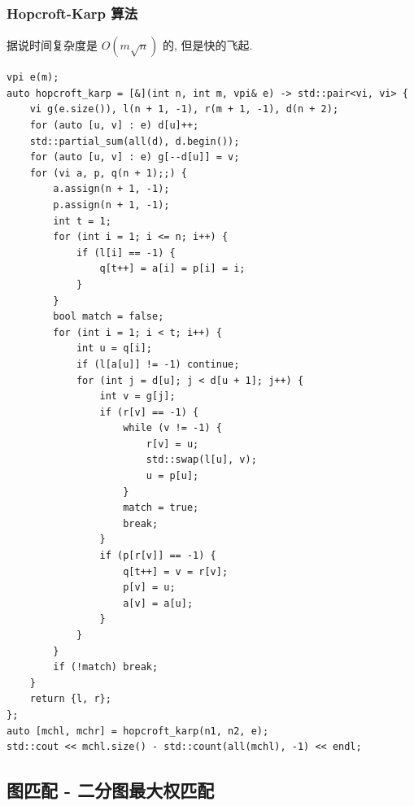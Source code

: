 \documentclass[UTF8, a4paper, titlepage, twoside]{ctexart}
\begin{document}
\subsubsection{ Hopcroft-Karp 算法 }
据说时间复杂度是 $O(m \sqrt{n})$ 的, 但是快的飞起. 
\begin{lstlisting}[style=cpp]
vpi e(m);
auto hopcroft_karp = [&](int n, int m, vpi& e) -> std::pair<vi, vi> {
    vi g(e.size()), l(n + 1, -1), r(m + 1, -1), d(n + 2);
    for (auto [u, v] : e) d[u]++;
    std::partial_sum(all(d), d.begin());
    for (auto [u, v] : e) g[--d[u]] = v;
    for (vi a, p, q(n + 1);;) {
        a.assign(n + 1, -1);
        p.assign(n + 1, -1);
        int t = 1;
        for (int i = 1; i <= n; i++) {
            if (l[i] == -1) {
                q[t++] = a[i] = p[i] = i;
            }
        }
        bool match = false;
        for (int i = 1; i < t; i++) {
            int u = q[i];
            if (l[a[u]] != -1) continue;
            for (int j = d[u]; j < d[u + 1]; j++) {
                int v = g[j];
                if (r[v] == -1) {
                    while (v != -1) {
                        r[v] = u;
                        std::swap(l[u], v);
                        u = p[u];
                    }
                    match = true;
                    break;
                }
                if (p[r[v]] == -1) {
                    q[t++] = v = r[v];
                    p[v] = u;
                    a[v] = a[u];
                }
            }
        }
        if (!match) break;
    }
    return {l, r};
};
auto [mchl, mchr] = hopcroft_karp(n1, n2, e);
std::cout << mchl.size() - std::count(all(mchl), -1) << endl;
\end{lstlisting}

\subsection{ 图匹配 - 二分图最大权匹配 }
\end{document}

